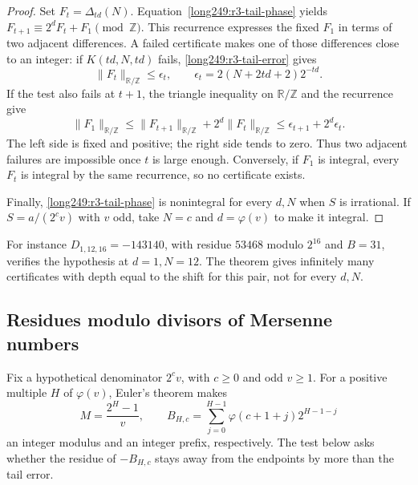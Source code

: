 \documentclass[11pt]{article}
\theoremstyle{plain}
\theoremstyle{definition}
\theoremstyle{remark}
\newcommand{\Z}{\mathbb{Z}}
\newcommand{\R}{\mathbb{R}}
\newcommand{\ph}{\varphi}
\begin{document}
\begin{proof}
Set $F_t=\Delta_{td}(N)$. Equation~\eqref{long249:r3-tail-phase} yields
$F_{t+1}\equiv2^dF_t+F_1\pmod\Z$. This recurrence expresses the fixed
$F_1$ in terms of two adjacent differences. A failed certificate makes
one of those differences close to an integer: if $K(td,N,td)$ fails,
\eqref{long249:r3-tail-error} gives
\[
 \|F_t\|_{\R/\Z}\le\epsilon_t,
 \qquad \epsilon_t=2(N+2td+2)2^{-td}.
\]
If the test also fails at $t+1$, the triangle inequality on $\R/\Z$
and the recurrence give
\[
 \|F_1\|_{\R/\Z}
 \le \|F_{t+1}\|_{\R/\Z}+2^d\|F_t\|_{\R/\Z}
 \le\epsilon_{t+1}+2^d\epsilon_t.
\]
The left side is fixed and positive; the right side tends to zero.
Thus two adjacent failures are impossible once $t$ is large enough.
Conversely, if $F_1$ is integral, every $F_t$ is integral by the same
recurrence, so no certificate exists.

Finally, \eqref{long249:r3-tail-phase} is
nonintegral for every $d,N$ when $S$ is irrational. If
$S=a/(2^cv)$ with $v$ odd, take $N=c$ and $d=\ph(v)$ to make it integral.
\end{proof}
For instance $D_{1,12,16}=-143140$, with residue $53468$ modulo $2^{16}$
and $B=31$, verifies the hypothesis at $d=1,N=12$. The theorem gives
infinitely many certificates with depth equal to the shift for this pair,
not for every $d,N$.

\subsection{Residues modulo divisors of Mersenne numbers}\label{long249:r3-mersenne}
Fix a hypothetical denominator $2^cv$, with $c\ge0$ and odd $v\ge1$.
For a positive multiple $H$ of $\varphi(v)$, Euler's theorem makes
\[
 M=\frac{2^H-1}{v},\qquad
 B_{H,c}=\sum_{j=0}^{H-1}\varphi(c+1+j)2^{H-1-j}
\]
an integer modulus and an integer prefix, respectively. The test below
asks whether the residue of $-B_{H,c}$ stays away from the endpoints
by more than the tail error.
\end{document}
